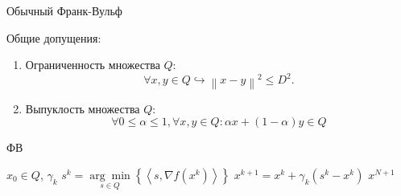 \documentclass{beamer}
\newcommand{\dotprod}[2]{\left\langle #1,#2 \right\rangle}
\newcommand{\norms}[1]{\left\| #1 \right\|}
\begin{document}
          
    
    
        




\begin{frame}{Обычный Франк-Вульф}

    Общие допущения:
    \begin{enumerate}
        \item Ограниченность множества $Q$:
            \begin{equation*}
                \forall x, y \in Q \hookrightarrow \norms{x- y}^2 \leq  D^2.
            \end{equation*}

        \item Выпуклость множества $Q$:
            \begin{equation*}
                \forall 0 \leq \alpha \leq 1, \forall x, y \in Q: \alpha x + (1-\alpha) y \in Q
            \end{equation*}
    \end{enumerate}

    \begin{algorithm}[H]
        \caption{ФВ}
        \begin{algorithmic}[1]
             $x_0 \in Q$, $\gamma_k$
                \State $s^k = \underset{s \in Q}{\arg\min}\left\{\left<s, \nabla f(x^k) \right> \right\}$
                \State $x^{k+1} = x^k + \gamma_k (s^k - x^k)$ \label{line:x^k}
            \EndFor
             $x^{N+1}$ 
        \end{algorithmic}
    \end{algorithm}

\end{frame}
\end{document}
